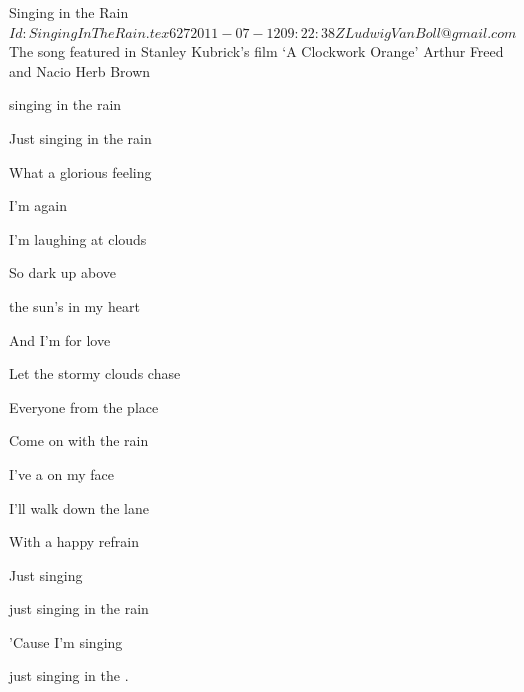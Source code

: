 \begin{SBSong}{Singing in the Rain}
  {$Id: SingingInTheRain.tex 627 2011-07-12 09:22:38Z LudwigVanBoll@gmail.com $}
  {The song featured in Stanley Kubrick's film `A Clockwork Orange'}
  {Arthur Freed and Nacio Herb Brown}
  \begin{SBVerse}
	 singing in the rain
	
	Just singing in the rain
	
	What a glorious feeling
	
	I'm  again

	I'm laughing at clouds
	
	So dark up above
	
	the sun's in my heart
	
	And I'm  for love

	Let the stormy clouds chase
	
	Everyone from the place
	
	Come on with the rain
	
	I've a  on my face

	I'll walk down the lane
	
	With a happy refrain
	
	Just singing
	
	just singing in the rain

	'Cause I'm singing
	
	just singing in the .
  \end{SBVerse}
\end{SBSong}
  